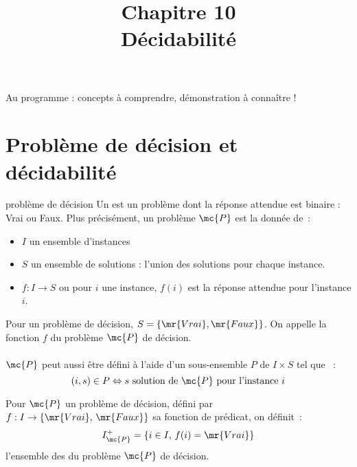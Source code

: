 
\setcounter{chapitre}{10}

\renewcommand{\newline}{\\}
\title{\Large Chapitre 10 \newline \Huge Décidabilité}



\maketitle

Au programme : concepts à comprendre, démonstration à connaître !

\section{Problème de décision et décidabilité}

\begin{definition}{}{problème de décision}
    Un  est un problème dont la réponse attendue est binaire : Vrai ou Faux. Plus précisément, un problème $\mc{P}$ est la donnée de~:
    \begin{itemize}
        \item $I$ un ensemble d'instances
        \item $S$ un ensemble de solutions : l'union des solutions pour chaque instance.
        \item $f : I \to S$ ou pour $i$ une instance, $f(i)$ est la réponse attendue pour l'instance $i$.
    \end{itemize}
    Pour un problème de décision, $S = \{\mr{Vrai}, \mr{Faux}\}$. On appelle la fonction $f$  du problème $\mc{P}$ de décision.\\\\
    $\mc{P}$ peut aussi être défini à l'aide d'un sous-ensemble $P$ de $I \times S$ tel que ~:
    $$(i,s) \in P \Leftrightarrow s \text{ solution de $\mc{P}$ pour l'instance $i$}$$
\end{definition}



Pour $\mc{P}$ un problème de décision, défini par $f : I \to \{\mr{Vrai},\, \mr{Faux}\}$ sa fonction de prédicat, on définit~:
$$I_{\mc{P}}^+ = \{i \in I,\, f(i) = \mr{Vrai}\}$$
l'ensemble des  du problème $\mc{P}$ de décision.



